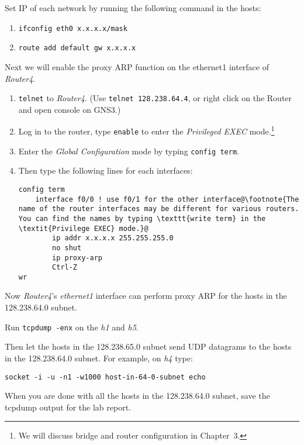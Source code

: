 \documentclass{../UTNetLab}
\begin{document}
    Set IP of each network by running the following command in the hosts:
    \begin{enumerate}
        \item \lstinline[emph={x}]{ifconfig eth0 x.x.x.x/mask}
        \item \lstinline[emph={x}]{route add default gw x.x.x.x}
    \end{enumerate}
    Next we will enable the proxy ARP function on the ethernet1 interface of \textit{Router4}.
    \begin{enumerate}
        \item \lstinline{telnet} to \textit{Router4}. (Use \lstinline{telnet 128.238.64.4}, or right click on the Router and open console on GNS3.)
        \item Log in to the router, type \lstinline[language={cisco}]{enable} to enter the \textit{Privileged EXEC} mode.\footnote{We will discuss bridge and router configuration in Chapter~3.}
        \item Enter the \textit{Global Configuration} mode by typing \lstinline[language={cisco}]{config term}.
        \item Then type the following lines for each interfaces:
        \begin{lstlisting}[language={cisco}, escapechar={@}, emph={x}]
config term
    interface f0/0 ! use f0/1 for the other interface@\footnote{The name of the router interfaces may be different for various routers. You can find the names by typing \texttt{write term} in the \textit{Privilege EXEC} mode.}@
        ip addr x.x.x.x 255.255.255.0
        no shut
        ip proxy-arp
        Ctrl-Z
wr
        \end{lstlisting}
    \end{enumerate}
    
    Now \textit{Router4}’s \textit{ethernet1} interface can perform proxy ARP for the hosts in the 128.238.64.0 subnet.

    Run \lstinline{tcpdump -enx} on the \textit{h1} and \textit{h5}.

    Then let the hosts in the 128.238.65.0 subnet send UDP datagrams to the hosts in the 128.238.64.0 subnet.
    For example, on \textit{h4} type:
    \begin{lstlisting}[emph={host-in-64-0-subnet}]
socket -i -u -n1 -w1000 host-in-64-0-subnet echo
    \end{lstlisting}

    When you are done with all the hosts in the 128.238.64.0 subnet, save the tcpdump output for the lab report.
\end{document}
